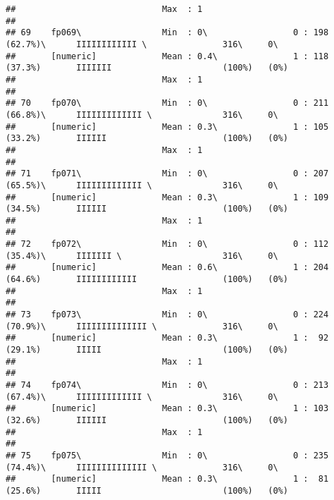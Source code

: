 \documentclass[]{article}
\begin{document}
\begin{verbatim}
##                             Max  : 1                                                                                       
## 
## 69    fp069\                Min  : 0\                 0 : 198 (62.7%)\      IIIIIIIIIIII \               316\     0\       
##       [numeric]             Mean : 0.4\               1 : 118 (37.3%)       IIIIIII                      (100%)   (0%)     
##                             Max  : 1                                                                                       
## 
## 70    fp070\                Min  : 0\                 0 : 211 (66.8%)\      IIIIIIIIIIIII \              316\     0\       
##       [numeric]             Mean : 0.3\               1 : 105 (33.2%)       IIIIII                       (100%)   (0%)     
##                             Max  : 1                                                                                       
## 
## 71    fp071\                Min  : 0\                 0 : 207 (65.5%)\      IIIIIIIIIIIII \              316\     0\       
##       [numeric]             Mean : 0.3\               1 : 109 (34.5%)       IIIIII                       (100%)   (0%)     
##                             Max  : 1                                                                                       
## 
## 72    fp072\                Min  : 0\                 0 : 112 (35.4%)\      IIIIIII \                    316\     0\       
##       [numeric]             Mean : 0.6\               1 : 204 (64.6%)       IIIIIIIIIIII                 (100%)   (0%)     
##                             Max  : 1                                                                                       
## 
## 73    fp073\                Min  : 0\                 0 : 224 (70.9%)\      IIIIIIIIIIIIII \             316\     0\       
##       [numeric]             Mean : 0.3\               1 :  92 (29.1%)       IIIII                        (100%)   (0%)     
##                             Max  : 1                                                                                       
## 
## 74    fp074\                Min  : 0\                 0 : 213 (67.4%)\      IIIIIIIIIIIII \              316\     0\       
##       [numeric]             Mean : 0.3\               1 : 103 (32.6%)       IIIIII                       (100%)   (0%)     
##                             Max  : 1                                                                                       
## 
## 75    fp075\                Min  : 0\                 0 : 235 (74.4%)\      IIIIIIIIIIIIII \             316\     0\       
##       [numeric]             Mean : 0.3\               1 :  81 (25.6%)       IIIII                        (100%)   (0%)     

\end{verbatim}
\end{document}
